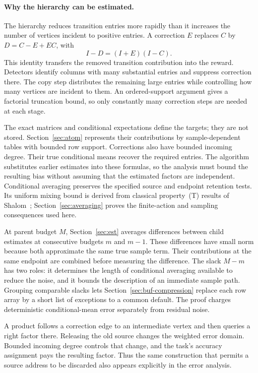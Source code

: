 \paragraph{Why the hierarchy can be estimated.}
The hierarchy reduces transition entries more rapidly than it increases
the number of vertices incident to positive entries.  A correction $E$ replaces $C$ by
$D=C-E+EC$, with
\[
                         I-D=(I+E)(I-C).
\]
This identity transfers the removed transition contribution into the
reward.  Detectors identify columns with many substantial entries and
suppress correction there.  The copy step distributes the remaining
large entries while controlling how many vertices are incident to them.  An ordered-support argument gives a factorial
truncation bound, so only constantly many correction steps are needed
at each stage.

The exact matrices and conditional expectations define the targets;
they are not stored.  Section~\ref{sec:atom} represents their
contributions by sample-dependent tables with bounded row support.
Corrections also have bounded incoming degree.  Their true conditional
means recover the required entries.  The algorithm substitutes earlier
estimates into these formulas, so the analysis must bound the resulting
bias without assuming that the estimated factors are independent.
Conditional averaging preserves the specified source and endpoint
retention tests.  Its uniform mixing bound is derived from classical
property~(T) results of Shalom~\cite{Shalom1999};
Section~\ref{sec:averaging} proves the finite-action and sampling
consequences used here.

At parent budget $M$, Section~\ref{sec:est} averages differences between
child estimates at consecutive budgets $m$ and $m-1$.  These differences
have small norm because both approximate the same true sample term.
Their contributions at the same endpoint are combined before measuring
the difference.
The slack $M-m$ has two roles: it determines the length of conditional
averaging available to reduce the noise, and it bounds the description
of an immediate sample path.  Grouping comparable slacks lets
Section~\ref{sec:buf-compression} replace each row array by a short list
of exceptions to a common default.  The proof charges deterministic
conditional-mean error separately from residual noise.

A product follows a correction edge to an intermediate vertex and then
queries a right factor there.  Releasing the old source changes the
weighted error domain.  Bounded incoming degree controls that change,
and the task's accuracy assignment pays the resulting factor.  Thus
the same construction that permits a source address to be discarded
also appears explicitly in the error analysis.

